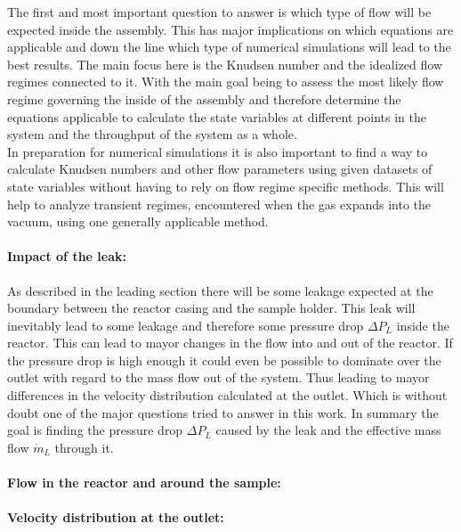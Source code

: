 	The first and most important question to answer is which type of flow will be expected inside the assembly. This has major implications on which equations are applicable and down the line which type of numerical simulations will lead to the best results. The main focus here is the Knudsen number and the idealized flow regimes connected to it. With the main goal being to assess the most likely flow regime governing the inside of the assembly and therefore determine the equations applicable to calculate the state variables at different points in the system and the throughput of the system as a whole.\\
	In preparation for numerical simulations it is also important to find a way to calculate Knudsen numbers and other flow parameters using given datasets of state variables without having to rely on flow regime specific methods. This will help to analyze transient regimes, encountered when the gas expands into the vacuum, using one generally applicable method.  

\paragraph{Impact of the leak:}

	As described in the leading section there will be some leakage expected at the boundary between the reactor casing and the sample holder. This leak will inevitably lead to some leakage and therefore some pressure drop $\Delta P_L$ inside the reactor. This can lead to mayor changes in the flow into and out of the reactor. If the pressure drop is high enough it could even be possible to dominate over the outlet with regard to the mass flow out of the system. Thus leading to mayor differences in the velocity distribution calculated at the outlet. Which is without doubt one of the major questions tried to answer in this work. In summary the goal is finding the pressure drop $\Delta P_L$ caused by the leak and the effective mass flow $\dot{m}_L$ through it.

\paragraph{Flow in the reactor and around the sample:}

\paragraph{Velocity distribution at the outlet:}
